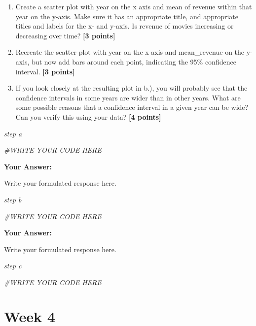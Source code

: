 \documentclass[
]{article}
\newenvironment{Shaded}{\begin{snugshade}}{\end{snugshade}}
\newcommand{\CommentTok}[1]{\textcolor[rgb]{0.56,0.35,0.01}{\textit{#1}}}
\providecommand{\tightlist}{%
  \setlength{\itemsep}{0pt}\setlength{\parskip}{0pt}}
\begin{document}
\begin{enumerate}
\def\labelenumi{\alph{enumi}.}
\tightlist
\item
  Create a scatter plot with year on the x axis and mean of revenue
  within that year on the y-axis. Make sure it has an appropriate title,
  and appropriate titles and labels for the x- and y-axis. Is revenue of
  movies increasing or decreasing over time? \textbf{[3 points]}
\item
  Recreate the scatter plot with year on the x axis and mean\_revenue on
  the y-axis, but now add bars around each point, indicating the 95\%
  confidence interval. \textbf{[3 points]}
\item
  If you look closely at the resulting plot in b.), you will probably
  see that the confidence intervals in some years are wider than in
  other years. What are some possible reasons that a confidence interval
  in a given year can be wide? Can you verify this using your data?
  \textbf{[4 points]}
\end{enumerate}

\emph{step a}

\begin{Shaded}
\begin{Highlighting}[]
\CommentTok{\#WRITE YOUR CODE HERE}
\end{Highlighting}
\end{Shaded}

\textbf{Your Answer:}

Write your formulated response here.

\emph{step b}

\begin{Shaded}
\begin{Highlighting}[]
\CommentTok{\#WRITE YOUR CODE HERE}
\end{Highlighting}
\end{Shaded}

\textbf{Your Answer:}

Write your formulated response here.

\emph{step c}

\begin{Shaded}
\begin{Highlighting}[]
\CommentTok{\#WRITE YOUR CODE HERE}
\end{Highlighting}
\end{Shaded}

\section{Week 4}\label{week-4}
\end{document}
